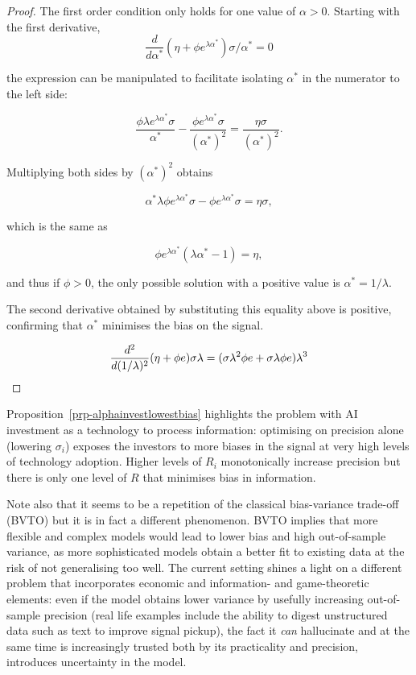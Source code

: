 \documentclass[
]{article}
\theoremstyle{plain}
\theoremstyle{definition}
\theoremstyle{remark}
\begin{document}
\begin{proof}

The first order condition only holds for one value of \(\alpha > 0\).
Starting with the first derivative, \[
\frac{d}{d \alpha^*} (\eta + \phi e^{\lambda \alpha^*}) \sigma / \alpha^* = 0
\]

the expression can be manipulated to facilitate isolating \(\alpha^*\)
in the numerator to the left side:

\[
\frac{\phi \lambda e^{\lambda \alpha^*} \sigma}{\alpha^*} - \frac{\phi e^{\lambda \alpha^*}\sigma}{(\alpha^*)^2} = \frac{\eta \sigma}{(\alpha^*)^2}.
\]

Multiplying both sides by \((\alpha^*)^2\) obtains

\[
\alpha^* \lambda \phi e^{\lambda \alpha^*} \sigma - \phi e^{\lambda \alpha^*}\sigma = \eta \sigma,
\]

which is the same as

\[
\phi e^{\lambda \alpha^*} (\lambda \alpha^* - 1)= \eta,
\]

and thus if \(\phi > 0\), the only possible solution with a positive
value is \(\alpha^* = 1/\lambda\).

The second derivative obtained by substituting this equality above is
positive, confirming that \(\alpha^*\) minimises the bias on the signal.

\[
\frac{d^2}{d (1/\lambda)^2} (\eta + \phi e) \sigma \lambda = (\sigma \lambda^2 \phi e + \sigma \lambda \phi e)\lambda^3 \\
\]

\end{proof}

Proposition~\ref{prp-alphainvestlowestbias} highlights the problem with
AI investment as a technology to process information: optimising on
precision alone (lowering \(\sigma_i\)) exposes the investors to more
biases in the signal at very high levels of technology adoption. Higher
levels of \(R_i\) monotonically increase precision but there is only one
level of \(R\) that minimises bias in information.

Note also that it seems to be a repetition of the classical
bias-variance trade-off (BVTO) but it is in fact a different phenomenon.
BVTO implies that more flexible and complex models would lead to lower
bias and high out-of-sample variance, as more sophisticated models
obtain a better fit to existing data at the risk of not generalising too
well. The current setting shines a light on a different problem that
incorporates economic and information- and game-theoretic elements: even
if the model obtains lower variance by usefully increasing out-of-sample
precision (real life examples include the ability to digest unstructured
data such as text to improve signal pickup), the fact it \emph{can}
hallucinate and at the same time is increasingly trusted both by its
practicality and precision, introduces uncertainty in the model.
\end{document}
